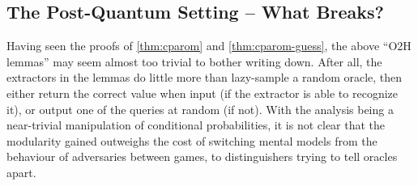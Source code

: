 



\subsection{The Post-Quantum Setting -- What Breaks?}
  Having seen the proofs of \cref{thm:cparom} and \cref{thm:cparom-guess}, 
    the above ``O2H lemmas'' may seem
    almost too trivial to bother writing down. After all, the extractors in the
    lemmas do little more than lazy-sample a random oracle, then either return
    the correct value when input (if the extractor is able to
    recognize it), or output one of the queries at random (if not).
    With the analysis being a near-trivial manipulation of
    conditional probabilities, it is not clear that the modularity gained 
    outweighs the cost of switching mental models from the behaviour of adversaries
    between games, to distinguishers trying to tell oracles apart.

